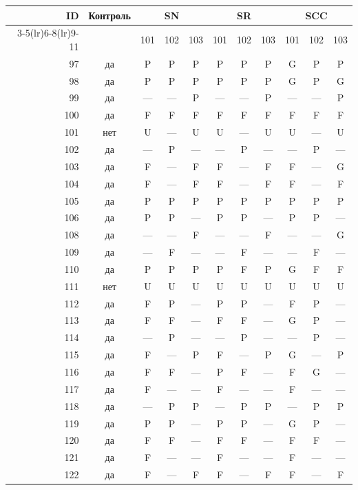 \begin{table}[p]\centering\small
\begin{tabular*}{\textwidth}{@{\extracolsep{\fill}}rc*{9}{c}@{}}\toprule
ID & Контроль & \multicolumn{3}{c}{SN} & \multicolumn{3}{c}{SR} & \multicolumn{3}{c}{SCC}\\
\cmidrule(lr){3-5}\cmidrule(lr){6-8}\cmidrule(lr){9-11}
 & & 101 & 102 & 103 & 101 & 102 & 103 & 101 & 102 & 103\\\midrule
97 & да & P & P & P & P & P & P & G & P & P\\
98 & да & P & P & P & P & P & P & G & P & G\\
99 & да & — & — & P & — & — & P & — & — & P\\
100 & да & F & F & F & F & F & F & F & F & F\\
101 & нет & U & — & U & U & — & U & U & — & U\\
102 & да & — & P & — & — & P & — & — & P & —\\
103 & да & F & — & F & F & — & F & F & — & G\\
104 & да & F & — & F & F & — & F & F & — & F\\
105 & да & P & P & P & P & P & P & P & P & P\\
106 & да & P & P & — & P & P & — & P & P & —\\
108 & да & — & — & F & — & — & F & — & — & G\\
109 & да & — & F & — & — & F & — & — & F & —\\
110 & да & P & P & P & P & F & P & G & F & F\\
111 & нет & U & U & U & U & U & U & U & U & U\\
112 & да & F & P & — & P & P & — & F & P & —\\
113 & да & F & F & — & F & F & — & G & P & —\\
114 & да & — & P & — & — & P & — & — & P & —\\
115 & да & F & — & P & F & — & P & G & — & P\\
116 & да & F & F & — & P & F & — & F & G & —\\
117 & да & F & — & — & F & — & — & F & — & —\\
118 & да & — & P & P & — & P & P & — & P & P\\
119 & да & P & P & — & P & P & — & G & P & —\\
120 & да & F & F & — & F & F & — & F & F & —\\
121 & да & F & — & — & F & — & — & F & — & —\\
122 & да & F & — & F & F & — & F & F & — & F\\

\end{tabular*}
\end{table}
